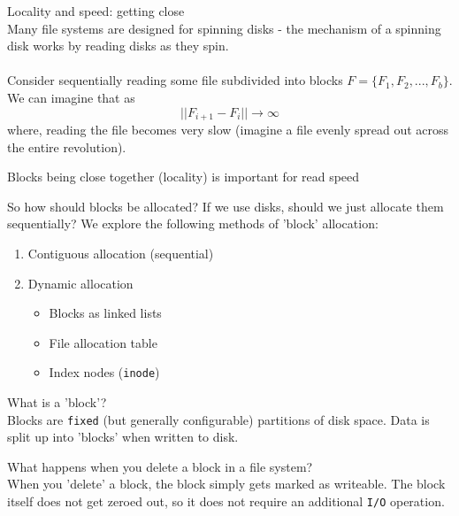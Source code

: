 \documentclass[journal, letterpaper]{IEEEtran}
\begin{document}
\begin{aside}{Locality and speed: getting close} \\
    Many file systems are designed for spinning disks - the mechanism of a spinning disk works by reading disks as they spin.
    \\ \\
    Consider sequentially reading some file subdivided into blocks $F = \{F_1, F_2, ..., F_b\}$. We can imagine that as
    $$ ||F_{i+1} - F_i|| \to \infty$$
    where, reading the file becomes very slow (imagine a file evenly spread out across the entire revolution).
    \begin{center}
        Blocks being close together (locality) is important for read speed
    \end{center}
\end{aside}
So how should blocks be allocated? If we use disks, should we just allocate them sequentially? We explore the following methods of 'block' allocation:
\begin{enumerate}
    \item Contiguous allocation (sequential)
    \item Dynamic allocation 
    \begin{itemize}
        \item Blocks as linked lists
        \item File allocation table
        \item Index nodes (\verb|inode|)
    \end{itemize}
\end{enumerate}
\begin{aside}{What is a 'block'?} \\
    Blocks are \verb|fixed| (but generally configurable) partitions of disk space. Data is split up into 'blocks' when written to disk.
\end{aside}
\begin{aside}{What happens when you delete a block in a file system?} \\
    When you 'delete' a block, the block simply gets marked as writeable. The block itself does not get zeroed out, so it does not require an additional \verb|I/O| operation.
\end{aside}
\end{document}
